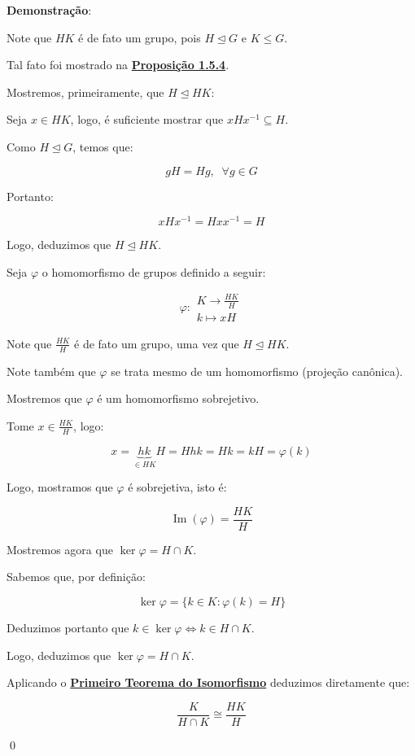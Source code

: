 \documentclass[16pt,openany]{book}
\theoremstyle{definition}
\begin{document}
{\color{red}
\textbf{Demonstração}:

Note que $HK$ é de fato um grupo, pois $H\trianglelefteq G$ e $K\leq G$.

Tal fato foi mostrado na \hyperlink{prop154}{\textbf{Proposição 1.5.4}}. 

Mostremos, primeiramente, que $H \trianglelefteq HK$:

Seja $x\in HK$, logo, é suficiente mostrar que $xHx^{-1} \subseteq H$.

Como $H\trianglelefteq G$, temos que:

\[
gH = Hg, \; \; \forall g\in G
\]

Portanto:

\[
xHx^{-1} = Hxx^{-1} = H
\]

Logo, deduzimos que $H \trianglelefteq HK$.

Seja $\varphi$ o homomorfismo de grupos definido a seguir:

\[
\varphi: 
\begin{array}{c}
K \to \frac{HK}{H} \\
k \mapsto xH
\end{array}
\]

Note que $\frac{HK}{H}$ é de fato um grupo, uma vez que $H\trianglelefteq HK$.

Note também que $\varphi$ se trata mesmo de um homomorfismo (projeção canônica).

Mostremos que $\varphi$ é um homomorfismo sobrejetivo.

Tome $x\in \frac{HK}{H}$, logo:

\[
x = \underbrace{hk}_{\in HK}H = Hhk = Hk = kH = \varphi(k)
\]

Logo, mostramos que $\varphi$ é sobrejetiva, isto é:

\[
\operatorname{Im}(\varphi) = \frac{HK}{H}
\]

Mostremos agora que $\ker \varphi = H\cap K$.

Sabemos que, por definição:

\[
\ker \varphi = \{k\in K : \varphi(k) = H\}
\]

Deduzimos portanto que $k\in \ker\varphi \iff k\in H\cap K$.

Logo, deduzimos que $\ker \varphi = H\cap K$.

Aplicando o \hyperlink{primteoiso}{\textbf{Primeiro Teorema do Isomorfismo}} deduzimos diretamente que:

\[
\frac{K}{H\cap K} \cong \frac{HK}{H}
\]

\qed}
\end{document}
